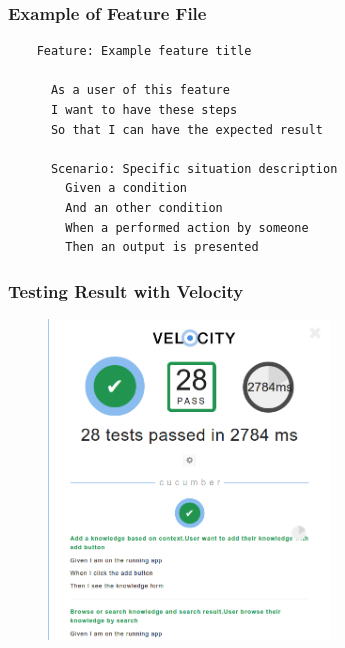 \documentclass[10pt, compress]{beamer}
\begin{document}

\begin{frame}[fragile]
  \frametitle{Example of Feature File}

  \begin{verbatim}
    Feature: Example feature title

      As a user of this feature
      I want to have these steps
      So that I can have the expected result

      Scenario: Specific situation description
        Given a condition
        And an other condition
        When a performed action by someone
        Then an output is presented
  \end{verbatim}

\end{frame}


\begin{frame}[fragile]
  \frametitle{Testing Result with Velocity}

  \begin{figure}[ht]
    \centering
    \vspace{-25pt}
    \includegraphics[height=8.5cm]{include/satellid-app-test.png}
    \vspace{-10pt}
    \label{fig:satellid-app-test}
  \end{figure}

\end{frame}

\end{document}
